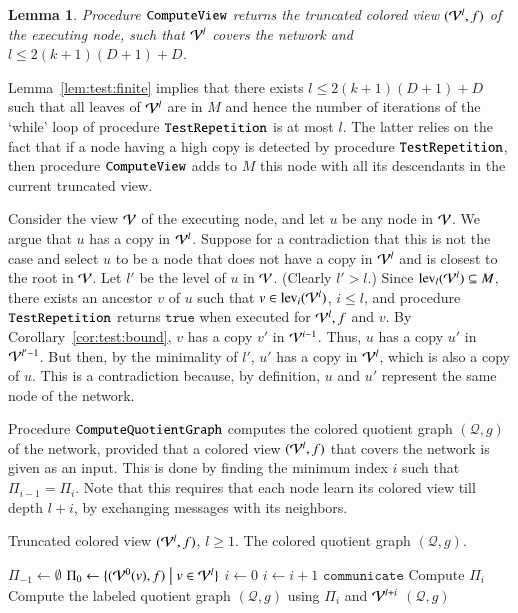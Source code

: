 \documentclass[a4paper,10pt]{article}
\newtheorem{lemma}{Lemma}[section]
\newcommand{\view}[1][]{\if!#1!\mathcal{V}\else\mathcal{V}^{#1}\fi}
\newcommand{\cQ}{\mathcal{Q}}
\newcommand{\partition}[1]{\Pi_{#1}}
\newcommand{\st}{\hspace{0.1cm}\bigl|\bigr.\hspace{0.1cm}}
\newcommand{\levelInView}[2]{\textup{lev}_{#2}(#1)}   \newcommand{\diam}{D}
\newcommand{\algorithmQuotient}{\textup{\texttt{ComputeQuotientGraph}}}
\newcommand{\algorithmView}{\textup{\texttt{ComputeView}}}
\newcommand{\algorithmTest}{\textup{\texttt{TestRepetition}}}
\newcommand{\returnTrue}{\texttt{true}}
\newcommand{\communicate}{\texttt{communicate}}
\newenvironment{proof}[1][Proof]
{\par\noindent{\bf #1:} }{\hspace*{\fill}\nolinebreak{$\Box$}\bigskip\par}
\begin{document}
\begin{lemma} \label{lem:covered}
Procedure $\algorithmView$ returns the truncated colored view $(\view[l],f)$ of the executing node, such that $\view[l]$ covers the network and $l\leq 2(k+1)(\diam+1)+\diam$.
\end{lemma}
\begin{proof}
Lemma~\ref{lem:test:finite} implies that there exists $l\leq 2(k+1)(\diam+1)+\diam$ such that all leaves of $\view[l]$ are in $M$ and hence the number of iterations of the `while' loop of procedure $\algorithmTest$ is at most $l$.
The latter relies on the fact that if a node having a high copy is detected by procedure $\algorithmTest$, then procedure $\algorithmView$ adds to $M$ this node with all its descendants in the current truncated view.

Consider the view $\view$ of the executing node, and let $u$ be any node in $\view$.
We argue that $u$ has a copy in $\view[l]$.
Suppose for a contradiction that this is not the case and select $u$ to be a node that does not have a copy in $\view[l]$ and is closest to the root in $\view$.
Let $l'$ be the level of $u$ in $\view$.
(Clearly $l'>l$.)
Since $\levelInView{\view[l]}{l}\subseteq M$, there exists an ancestor $v$ of $u$ such that $v\in\levelInView{\view[l]}{i}$, $i\leq l$, and procedure $\algorithmTest$ returns $\returnTrue$ when executed for $\view[l],f$ and $v$.
By Corollary~\ref{cor:test:bound}, $v$ has a copy $v'$ in $\view[i-1]$.
Thus, $u$ has a copy $u'$ in $\view[l'-1]$.
But then, by the minimality of $l'$, $u'$ has a copy in $\view[l]$, which is also a copy of $u$.
This is a contradiction because, by definition, $u$ and $u'$ represent the same node of the network.
\end{proof}



\medskip
Procedure $\algorithmQuotient$ computes the colored quotient graph $(\cQ,g)$ of the network, provided that a colored view $(\view[l],f)$ that covers the network is given as an input.
This is done by finding the minimum index $i$ such that $\partition{i-1}=\partition{i}$.
Note that this requires that each node learn its colored view till depth $l+i$, by exchanging messages with its neighbors.
\begin{algorithm} \caption{$\algorithmQuotient( \view[l],f )$}
\label{alg:ComputeQuotientGraph}
\begin{algorithmic}
\REQUIRE Truncated colored view $(\view[l],f)$, $l\geq 1$.
\ENSURE  The colored quotient graph $(\cQ,g)$.

\STATE $\partition{-1} \leftarrow \emptyset$
\STATE $\partition{0} \leftarrow \{ (\view[0](v),f) \st v\in\view[l] \}$
\STATE $i\leftarrow 0$
\WHILE{$\partition{i}\neq\partition{i-1}$}
   \STATE $i \leftarrow i+1$
   \STATE $\communicate$
   \STATE Compute $\partition{i}$
\ENDWHILE
\STATE Compute the labeled quotient graph $(\cQ,g)$ using $\partition{i}$ and $\view[l+i]$
\RETURN $(\cQ,g)$
\end{algorithmic}
\end{algorithm}
\end{document}
